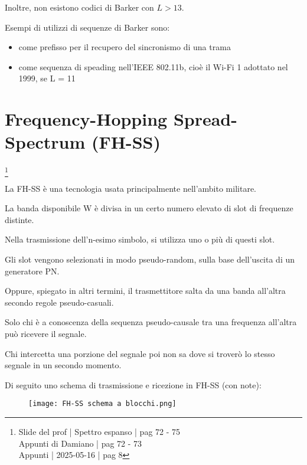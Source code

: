 Inoltre, non esistono codici di Barker con $L > 13$. \newline 

Esempi di utilizzi di sequenze di Barker sono: 

\begin{itemize}
    \item come prefisso per il recupero del sincronismo di una trama 
    \item come sequenza di speading nell'IEEE 802.11b, cioè il Wi-Fi 1 adottato nel 1999, se L = 11
\end{itemize}

\newpage 

\section{Frequency-Hopping Spread-Spectrum (FH-SS)}
\footnote{Slide del prof | Spettro espanso | pag 72 - 75\\
Appunti di Damiano | pag 72 - 73\\
Appunti | 2025-05-16 | pag 8 
} 

La FH-SS è una tecnologia usata principalmente nell'ambito militare. \newline 

La banda disponibile W è divisa in un certo numero elevato di slot di frequenze distinte. \newline 

Nella trasmissione dell'n-esimo simbolo, 
si utilizza uno o più di questi slot. \newline 

Gli slot vengono selezionati in modo pseudo-random, 
sulla base dell'uscita di un generatore PN. \newline 

Oppure, spiegato in altri termini, 
il trasmettitore salta da una banda all'altra secondo regole pseudo-casuali. \newline 

Solo chi è a conoscenza della sequenza pseudo-causale tra una frequenza all'altra può ricevere il segnale. \newline 

Chi intercetta una porzione del segnale poi non sa dove si troverò lo stesso segnale in un secondo momento. \newline 

Di seguito uno schema di trasmissione e ricezione in FH-SS (con note):  

\begin{figure}[h]
    \centering
    \texttt{[image: FH-SS schema a blocchi.png]}
\end{figure}

